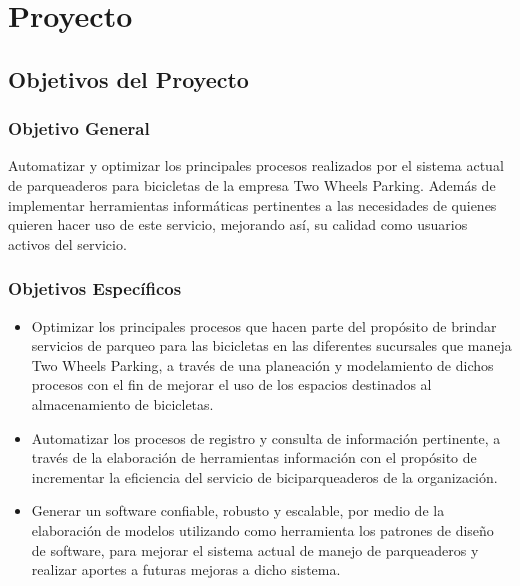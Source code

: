 \chapter{Proyecto}

\section{Objetivos del Proyecto} 

\subsection{Objetivo General} 
Automatizar y optimizar los principales procesos realizados por el sistema actual de parqueaderos para bicicletas de la empresa Two Wheels Parking. Además de implementar herramientas informáticas pertinentes a las necesidades de quienes quieren hacer uso de este servicio, mejorando así, su calidad como usuarios activos del servicio. 

\subsection{Objetivos Específicos}
\begin{itemize}
	\item Optimizar los principales procesos que hacen parte del propósito de brindar servicios de parqueo para las bicicletas en las diferentes sucursales que maneja Two Wheels Parking, a través de una planeación y modelamiento de dichos procesos con el fin de mejorar el uso de los espacios destinados al almacenamiento de bicicletas.
	\item Automatizar los procesos de registro y consulta de información pertinente, a través de la elaboración de herramientas información con el propósito de incrementar la eficiencia del servicio de biciparqueaderos de la organización.
	\item Generar un software confiable, robusto y escalable, por medio de la elaboración de modelos utilizando como herramienta los patrones de diseño de software, para mejorar el sistema actual de manejo de parqueaderos y realizar aportes a futuras mejoras a dicho sistema.
\end{itemize}


